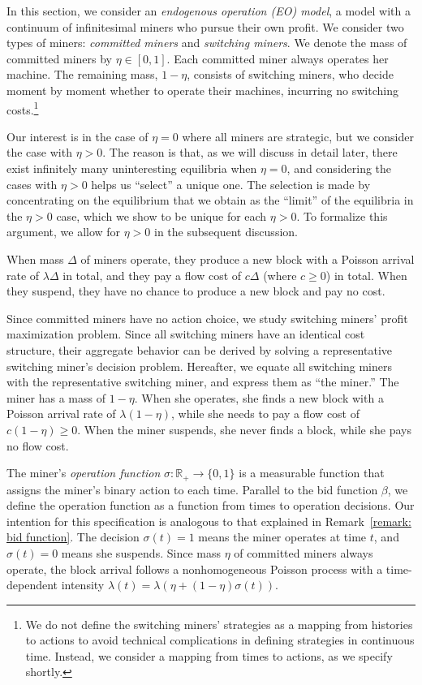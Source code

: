 \documentclass[12pt, letterpaper]{article}
\begin{document}
In this section, we consider an \emph{endogenous operation (EO) model}, a model with a continuum of infinitesimal miners who pursue their own profit. We consider two types of miners: \emph{committed miners} and \emph{switching miners}. We denote the mass of committed miners by $\eta \in [0, 1]$. Each committed miner always operates her machine. The remaining mass, $1 -\eta$, consists of switching miners, who decide moment by moment whether to operate their machines, incurring no switching costs.\footnote{We do not define the switching miners' strategies as a mapping from histories to actions to avoid technical complications in defining strategies in continuous time. Instead, we consider a mapping from times to actions, as we specify shortly.} 

Our interest is in the case of $\eta = 0$ where all miners are strategic, but we consider the case with $\eta>0$. The reason is that, as we will discuss in detail later, there exist infinitely many uninteresting equilibria when $\eta=0$, and considering the cases with $\eta>0$ helps us ``select'' a unique one. The selection is made by concentrating on the equilibrium that we obtain as the ``limit'' of the equilibria in the $\eta > 0$ case, which we show to be unique for each $\eta>0$. To formalize this argument, we allow for $\eta > 0$ in the subsequent discussion.

When mass $\Delta$ of miners operate, they produce a new block with a Poisson arrival rate of $\lambda \Delta$ in total, and they pay a flow cost of $c \Delta$ (where $c \ge 0$) in total. When they suspend, they have no chance to produce a new block and pay no cost.

Since committed miners have no action choice, we study switching miners' profit maximization problem. Since all switching miners have an identical cost structure, their aggregate behavior can be derived by solving a representative switching miner's decision problem. Hereafter, we equate all switching miners with the representative switching miner, and express them as ``the miner.'' The miner has a mass of $1 - \eta$. When she operates, she finds a new block with a Poisson arrival rate of $\lambda (1 - \eta)$, while she needs to pay a flow cost of $c(1-\eta) \ge 0$. When the miner suspends, she never finds a block, while she pays no flow cost.

The miner's \emph{operation function} $\sigma: \mathbb{R}_+ \to \{0, 1\}$ is a measurable function that assigns the miner's binary action to each time. Parallel to the bid function $\beta$, we define the operation function as a function from times to operation decisions. Our intention for this specification is analogous to that explained in Remark~\ref{remark: bid function}. The decision $\sigma(t) = 1$ means the miner operates at time $t$, and $\sigma(t) = 0$ means she suspends. Since mass $\eta$ of committed miners always operate, the block arrival follows a nonhomogeneous Poisson process with a time-dependent intensity $\lambda(t) = \lambda (\eta + (1 - \eta) \sigma(t))$.
\end{document}
